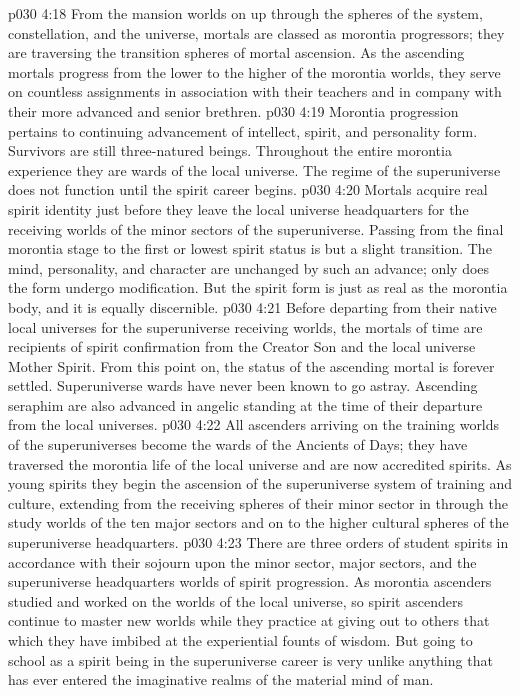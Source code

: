 \pc \vs p030 4:18 \bibnobreakspace {} From the mansion worlds on up through the spheres of the system, constellation, and the universe, mortals are classed as morontia progressors; they are traversing the transition spheres of mortal ascension. As the ascending mortals progress from the lower to the higher of the morontia worlds, they serve on countless assignments in association with their teachers and in company with their more advanced and senior brethren.
\vs p030 4:19 Morontia progression pertains to continuing advancement of intellect, spirit, and personality form. Survivors are still three\hyp{}natured beings. Throughout the entire morontia experience they are wards of the local universe. The regime of the superuniverse does not function until the spirit career begins.
\vs p030 4:20 Mortals acquire real spirit identity just before they leave the local universe headquarters for the receiving worlds of the minor sectors of the superuniverse. Passing from the final morontia stage to the first or lowest spirit status is but a slight transition. The mind, personality, and character are unchanged by such an advance; only does the form undergo modification. But the spirit form is just as real as the morontia body, and it is equally discernible.
\vs p030 4:21 Before departing from their native local universes for the superuniverse receiving worlds, the mortals of time are recipients of spirit confirmation from the Creator Son and the local universe Mother Spirit. From this point on, the status of the ascending mortal is forever settled. Superuniverse wards have never been known to go astray. Ascending seraphim are also advanced in angelic standing at the time of their departure from the local universes.
\pc \vs p030 4:22 \bibnobreakspace {} All ascenders arriving on the training worlds of the superuniverses become the wards of the Ancients of Days; they have traversed the morontia life of the local universe and are now accredited spirits. As young spirits they begin the ascension of the superuniverse system of training and culture, extending from the receiving spheres of their minor sector in through the study worlds of the ten major sectors and on to the higher cultural spheres of the superuniverse headquarters.
\vs p030 4:23 There are three orders of student spirits in accordance with their sojourn upon the minor sector, major sectors, and the superuniverse headquarters worlds of spirit progression. As morontia ascenders studied and worked on the worlds of the local universe, so spirit ascenders continue to master new worlds while they practice at giving out to others that which they have imbibed at the experiential founts of wisdom. But going to school as a spirit being in the superuniverse career is very unlike anything that has ever entered the imaginative realms of the material mind of man.\plusone
